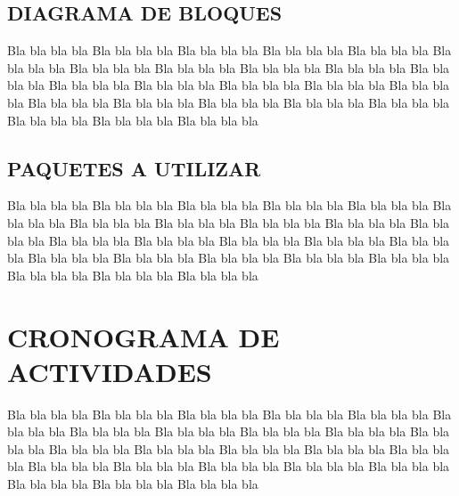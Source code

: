 \documentclass[letterpaper, 10 pt, conference]{ieeeconf}  %
\begin{document}
\subsection{DIAGRAMA DE BLOQUES}
Bla bla bla bla Bla bla bla bla Bla bla bla bla Bla bla bla bla
Bla bla bla bla Bla bla bla bla Bla bla bla bla Bla bla bla bla
Bla bla bla bla Bla bla bla bla Bla bla bla bla Bla bla bla bla
Bla bla bla bla Bla bla bla bla Bla bla bla bla Bla bla bla bla
Bla bla bla bla Bla bla bla bla Bla bla bla bla Bla bla bla bla
Bla bla bla bla Bla bla bla bla Bla bla bla bla Bla bla bla bla
\subsection{PAQUETES A UTILIZAR}
Bla bla bla bla Bla bla bla bla Bla bla bla bla Bla bla bla bla
Bla bla bla bla Bla bla bla bla Bla bla bla bla Bla bla bla bla
Bla bla bla bla Bla bla bla bla Bla bla bla bla Bla bla bla bla
Bla bla bla bla Bla bla bla bla Bla bla bla bla Bla bla bla bla
Bla bla bla bla Bla bla bla bla Bla bla bla bla Bla bla bla bla
Bla bla bla bla Bla bla bla bla Bla bla bla bla Bla bla bla bla


\section{CRONOGRAMA DE ACTIVIDADES}
Bla bla bla bla Bla bla bla bla Bla bla bla bla Bla bla bla bla
Bla bla bla bla Bla bla bla bla Bla bla bla bla Bla bla bla bla
Bla bla bla bla Bla bla bla bla Bla bla bla bla Bla bla bla bla
Bla bla bla bla Bla bla bla bla Bla bla bla bla Bla bla bla bla
Bla bla bla bla Bla bla bla bla Bla bla bla bla Bla bla bla bla
Bla bla bla bla Bla bla bla bla Bla bla bla bla Bla bla bla bla



%






\end{document}
